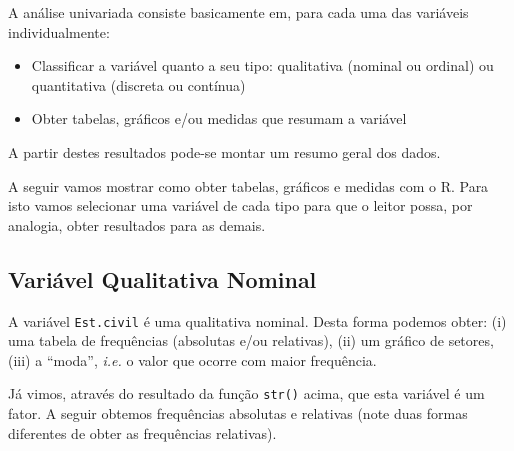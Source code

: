 \documentclass[10pt,a4paper]{book}
\newenvironment{Shaded}{\begin{snugshade}}{\end{snugshade}}
\newcommand{\KeywordTok}[1]{\textcolor[rgb]{0.13,0.29,0.53}{\textbf{#1}}}
\newcommand{\DecValTok}[1]{\textcolor[rgb]{0.00,0.00,0.81}{#1}}
\newcommand{\FloatTok}[1]{\textcolor[rgb]{0.00,0.00,0.81}{#1}}
\newcommand{\StringTok}[1]{\textcolor[rgb]{0.31,0.60,0.02}{#1}}
\newcommand{\OperatorTok}[1]{\textcolor[rgb]{0.81,0.36,0.00}{\textbf{#1}}}
\newcommand{\NormalTok}[1]{#1}
\providecommand{\tightlist}{%
  \setlength{\itemsep}{0pt}\setlength{\parskip}{0pt}}
\begin{document}
A análise univariada consiste basicamente em, para cada uma das
variáveis individualmente:

\begin{itemize}
\tightlist
\item
  Classificar a variável quanto a seu tipo: qualitativa (nominal ou
  ordinal) ou quantitativa (discreta ou contínua)
\item
  Obter tabelas, gráficos e/ou medidas que resumam a variável
\end{itemize}

A partir destes resultados pode-se montar um resumo geral dos dados.

A seguir vamos mostrar como obter tabelas, gráficos e medidas com o R.
Para isto vamos selecionar uma variável de cada tipo para que o leitor
possa, por analogia, obter resultados para as demais.

\subsection{Variável Qualitativa
Nominal}\label{variavel-qualitativa-nominal}

A variável \texttt{Est.civil} é uma qualitativa nominal. Desta forma
podemos obter: (i) uma tabela de frequências (absolutas e/ou relativas),
(ii) um gráfico de setores, (iii) a ``moda'', \emph{i.e.} o valor que
ocorre com maior frequência.

Já vimos, através do resultado da função \texttt{str()} acima, que esta
variável é um fator. A seguir obtemos frequências absolutas e relativas
(note duas formas diferentes de obter as frequências relativas).

\begin{Shaded}
\end{Shaded}
\end{document}

